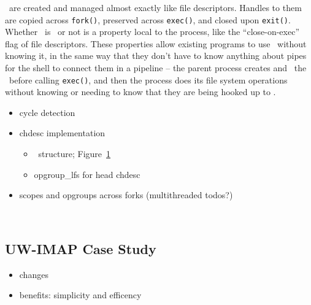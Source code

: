 \Opgroups\ are created and managed almost exactly like file descriptors. Handles
to them are copied across \texttt{fork()}, preserved across \texttt{exec()}, and
closed upon \texttt{exit()}. Whether \anopgroup\ is \engaged\ or not is a
property local to the process, like the ``close-on-exec'' flag of file
descriptors. These properties allow existing programs to use \opgroups\ without
knowing it, in the same way that they don't have to know anything about pipes
for the shell to connect them in a pipeline -- the parent process creates and
\engages\ the \opgroups\ before calling \texttt{exec()}, and then the process
does its file system operations without knowing or needing to know that they are
being hooked up to \anopgroup.

\begin{itemize}
\item cycle detection
\item chdesc implementation
  \begin{itemize}
  \item \chdesc\ structure; Figure~\ref{fig:opgroup-chdescs}
  \item opgroup\_lfs for head chdesc
  \end{itemize}
\item scopes and opgroups across forks (multithreaded todos?)
\end{itemize}

\begin{figure}[htb]
\caption{\label{fig:opgroup-chdescs} \Opgroup\ \Chdescs}
\end{figure}

\subsection{UW-IMAP Case Study}
\label{sec:opgroup:uwimap}
\begin{itemize}
\item changes
\item benefits: simplicity and efficency
\end{itemize}
